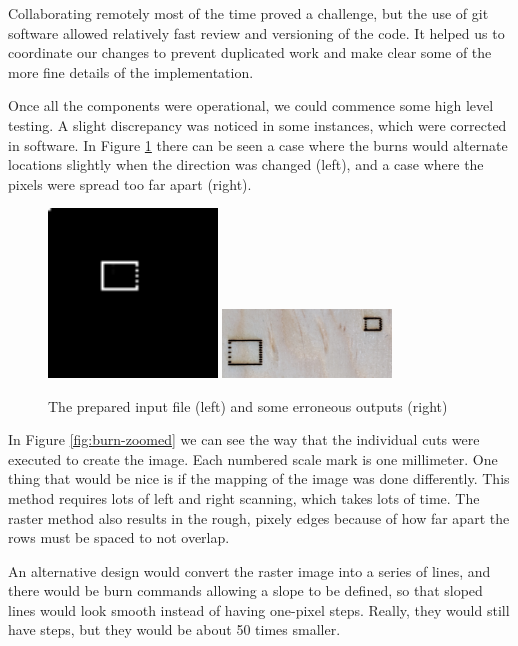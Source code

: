 \documentclass[11pt]{LaTeX-Classes/math-hw}
\begin{document}
Collaborating remotely most of the time proved a challenge, but the use of git software allowed
relatively fast review and versioning of the code.
It helped us to coordinate our changes to prevent duplicated work
and make clear some of the more fine details of the implementation.

Once all the components were operational, we could commence some high level testing.
A slight discrepancy was noticed in some instances, which were corrected in software.
In Figure \ref{fig:off-by-one} there can be seen a case where the burns would alternate
locations slightly when the direction was changed (left), and a case where the pixels were
spread too far apart (right).
\begin{figure}[H]
  \begin{center}
    \includegraphics[width=0.4\textwidth]{test4}
    \includegraphics[width=0.4\textwidth]{burn-errors}
    \caption{The prepared input file (left) and some erroneous outputs (right)}
    \label{fig:off-by-one}
  \end{center}
\end{figure}

In Figure \ref{fig:burn-zoomed} we can see the way that the individual cuts were executed to
create the image.
Each numbered scale mark is one millimeter.
One thing that would be nice is if the mapping of the image was done differently.
This method requires lots of left and right scanning, which takes lots of time.
The raster method also results in the rough, pixely edges
because of how far apart the rows must be spaced to not overlap.

An alternative design would convert the raster image into a series of lines,
and there would be burn commands allowing a slope to be defined, so that
sloped lines would look smooth instead of having one-pixel steps.
Really, they would still have steps, but they would be about 50 times smaller.
\end{document}
